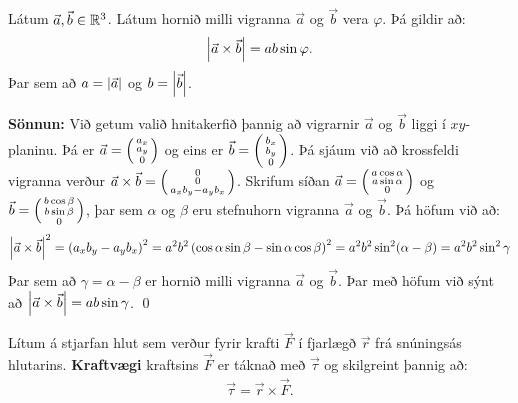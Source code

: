 \ifdefined \wholebook \else\documentclass[oneside]{book}\usepackage{EdlBook}\graphicspath{{figures/}}
\begin{document}
\begin{tcolorbox}
\begin{setning}
Látum $\Vec{a}, \Vec{b} \in \mathbb{R}^3$. Látum hornið milli vigranna $\Vec{a}$ og $\Vec{b}$ vera $\varphi$. Þá gildir að:
\begin{align*}
    \abs{\Vec{a} \times \Vec{b}} = ab\sin\varphi.
\end{align*}
Þar sem að $a = \abs{\Vec{a}}$ og $b = \abs{\Vec{b}}$.
\end{setning}
\end{tcolorbox}

\textbf{Sönnun:} Við getum valið hnitakerfið þannig að vigrarnir $\Vec{a}$ og $\Vec{b}$ liggi í $xy$-planinu. Þá er $\Vec{a} = \smqty(a_x \\ a_y \\ 0)$ og eins er $\Vec{b} = \smqty(b_x \\ b_y \\ 0)$. Þá sjáum við að krossfeldi vigranna verður $\Vec{a} \times \Vec{b} = \smqty(0 \\ 0 \\ a_x b_y - a_y b_x)$. Skrifum síðan $\Vec{a} = \smqty(a\cos\alpha \\ a\sin\alpha \\ 0)$ og $\Vec{b} = \smqty(b\cos\beta \\ b\sin\beta \\ 0)$, þar sem $\alpha$ og $\beta$ eru stefnuhorn vigranna $\vec{a}$ og $\vec{b}$. Þá höfum við að:
\begin{align*}
    \abs{\Vec{a}\times \Vec{b}}^2 = \left(a_xb_y - a_y b_x\right)^2  = a^2b^2 \left( \cos\alpha \sin\beta - \sin\alpha \cos\beta \right)^2 = a^2b^2 \sin^2(\alpha - \beta) = a^2b^2\sin^2\gamma
\end{align*}
Þar sem að $\gamma = \alpha - \beta$ er hornið milli vigranna $\Vec{a}$ og $\Vec{b}$. Þar með höfum við sýnt að $\abs{\Vec{a}\times \Vec{b}} = ab\sin\gamma$. \qed


\begin{tcolorbox}
\begin{definition}
Lítum á stjarfan hlut sem verður fyrir krafti $\vec{F}$ í fjarlægð $\vec{r}$ frá snúningsás hlutarins. \textbf{Kraftvægi} kraftsins $\vec{F}$ er táknað með $\vec{\tau}$ og skilgreint þannig að:
\begin{align*}
    \vec{\tau} = \vec{r} \times \vec{F}.
\end{align*}
\end{definition}
\end{tcolorbox}
\end{document}

